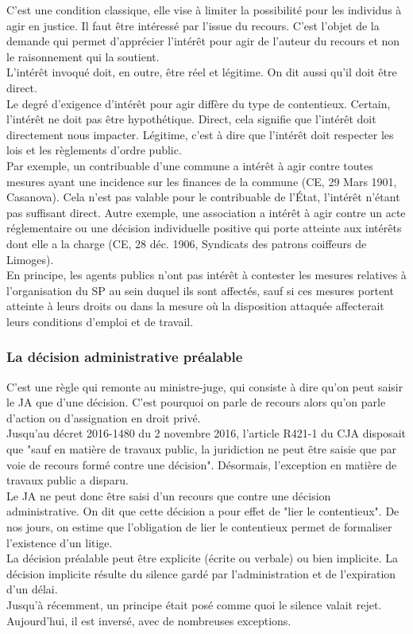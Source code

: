 \documentclass[10pt, a4paper, openany]{book}
\begin{document}
C'est une condition classique, elle vise à limiter la possibilité pour les individus à agir en justice. Il faut être intéressé par l'issue du recours. C'est l'objet de la demande qui permet d'apprécier l'intérêt pour agir de l'auteur du recours et non le raisonnement qui la soutient. \\
L'intérêt invoqué doit, en outre, être réel et légitime. On dit aussi qu'il doit être direct. \\
Le degré d'exigence d'intérêt pour agir diffère du type de contentieux. Certain, l'intérêt ne doit pas être hypothétique. Direct, cela signifie que l'intérêt doit directement nous impacter. Légitime, c'est à dire que l'intérêt doit respecter les lois et les règlements d'ordre public. \\
Par exemple, un contribuable d'une commune a intérêt à agir contre toutes mesures ayant une incidence sur les finances de la commune (CE, 29 Mars 1901, Casanova). Cela n'est pas valable pour le contribuable de l'État, l'intérêt n'étant pas suffisant direct. Autre exemple, une association a intérêt à agir contre un acte réglementaire ou une décision individuelle positive qui porte atteinte aux intérêts dont elle a la charge (CE, 28 déc. 1906, Syndicats des patrons coiffeurs de Limoges). \\
En principe, les agents publics n'ont pas intérêt à contester les mesures relatives à l'organisation du SP au sein duquel ils sont affectés, sauf si ces mesures portent atteinte à leurs droits ou dans la mesure où la disposition attaquée affecterait leurs conditions d'emploi et de travail.  

\subsubsection{La décision administrative préalable}

C'est une règle qui remonte au ministre-juge, qui consiste à dire qu'on peut saisir le JA que d'une décision. C'est pourquoi on parle de recours alors qu'on parle d'action ou d'assignation en droit privé. \\
Jusqu'au décret 2016-1480 du 2 novembre 2016, l'article R421-1 du CJA disposait que "sauf en matière de travaux public, la juridiction ne peut être saisie que par voie de recours formé contre une décision". Désormais, l'exception en matière de travaux public a disparu. \\
Le JA ne peut donc être saisi d'un recours que contre une décision administrative. On dit que cette décision a pour effet de "lier le contentieux". De nos jours, on estime que l'obligation de lier le contentieux permet de formaliser l'existence d'un litige. \\
La décision préalable peut être explicite (écrite ou verbale) ou bien implicite. La décision implicite résulte du silence gardé par l'administration et de l'expiration d'un délai. \\
Jusqu'à récemment, un principe était posé comme quoi le silence valait rejet. Aujourd'hui, il est inversé, avec de nombreuses exceptions.
\end{document}
